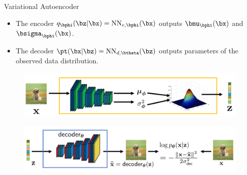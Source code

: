 \documentclass{beamer}
\begin{document}
\begin{frame}{Variational Autoencoder}
	\begin{itemize}
		\item The encoder $q_{\bphi}(\bz| \bx) = \text{NN}_{e, \bphi}(\bx)$ outputs $\bmu_{\bphi}(\bx)$ and $\bsigma_{\bphi}(\bx)$.
		\item The decoder $\pt(\bx | \bz) = \text{NN}_{d, \btheta}(\bz)$ outputs parameters of the observed data distribution.
	\end{itemize}
	\begin{figure}[h]
		\centering
		\includegraphics[width=0.7\linewidth]{figs/vae-encoder}
	\end{figure}
	\begin{figure}[h]
		\centering
		\includegraphics[width=0.9\linewidth]{figs/vae-decoder}
	\end{figure}
\end{frame}
\end{document}
